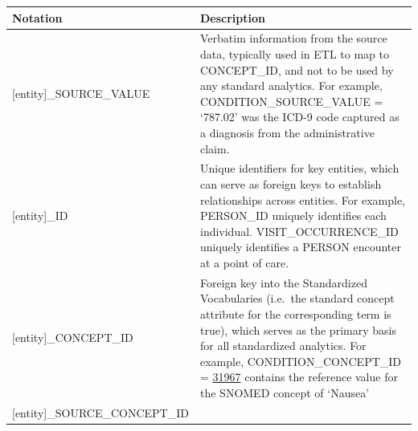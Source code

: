 \documentclass[11pt]{book}
\begin{document}
\begin{longtable}[]{@{}ll@{}}
\toprule
\begin{minipage}[b]{0.34\columnwidth}\raggedright\strut
Notation\strut
\end{minipage} & \begin{minipage}[b]{0.61\columnwidth}\raggedright\strut
Description\strut
\end{minipage}\tabularnewline
\midrule
\endhead
\begin{minipage}[t]{0.34\columnwidth}\raggedright\strut
{[}entity{]}\_SOURCE\_VALUE\strut
\end{minipage} & \begin{minipage}[t]{0.61\columnwidth}\raggedright\strut
Verbatim information from the source data, typically used in ETL to map
to CONCEPT\_ID, and not to be used by any standard analytics. For
example, CONDITION\_SOURCE\_VALUE = `787.02' was the ICD-9 code captured
as a diagnosis from the administrative claim.\strut
\end{minipage}\tabularnewline
\begin{minipage}[t]{0.34\columnwidth}\raggedright\strut
{[}entity{]}\_ID\strut
\end{minipage} & \begin{minipage}[t]{0.61\columnwidth}\raggedright\strut
Unique identifiers for key entities, which can serve as foreign keys to
establish relationships across entities. For example, PERSON\_ID
uniquely identifies each individual. VISIT\_OCCURRENCE\_ID uniquely
identifies a PERSON encounter at a point of care.\strut
\end{minipage}\tabularnewline
\begin{minipage}[t]{0.34\columnwidth}\raggedright\strut
{[}entity{]}\_CONCEPT\_ID\strut
\end{minipage} & \begin{minipage}[t]{0.61\columnwidth}\raggedright\strut
Foreign key into the Standardized Vocabularies (i.e.~the standard
concept attribute for the corresponding term is true), which serves as
the primary basis for all standardized analytics. For example,
CONDITION\_CONCEPT\_ID =
\href{http://athena.ohdsi.org/search-terms/terms/31967}{31967} contains
the reference value for the SNOMED concept of `Nausea'\strut
\end{minipage}\tabularnewline
\begin{minipage}[t]{0.34\columnwidth}\raggedright\strut
{[}entity{]}\_SOURCE\_CONCEPT\_ID\strut
\end{minipage} & \begin{minipage}[t]{0.61\columnwidth}\raggedright\strut

\end{minipage}
\end{longtable}
\end{document}
